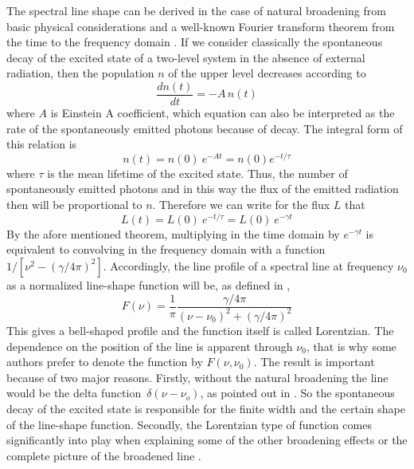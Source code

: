 The spectral line shape can be derived in the case of natural
broadening from basic physical considerations and a well-known Fourier
transform theorem from the time to the frequency domain \citep{thorne:99}. If we
consider classically the spontaneous decay of the excited state of a
two-level system in the absence of external radiation, then the population
$n$ of the upper level decreases according to
\begin{equation}\label{spon_decay_diff}
  \frac{dn(t)}{dt} = -A\,n(t)
\end{equation}
where $A$ is Einstein A coefficient, which equation can also be
interpreted as the rate of the spontaneously emitted photons because
of decay. The integral form of this relation is 
\begin{equation}\label{spon_decay_exp}
  n(t)=n(0)~e^{-At}=n(0)e^{-t/\tau}
\end{equation}
where $ \tau$ is the mean lifetime of the excited state. Thus, the
number of spontaneously emitted photons and in this way the flux of
the emitted radiation then will be proportional to $n$. Therefore we
can write for the flux $L$ that
\begin{equation}\label{flux}
  L(t)=L(0)~e^{-t/ \tau}=L(0)~e^{-\gamma t}
\end{equation}
By the afore mentioned theorem, multiplying in the time domain by
$e^{-\gamma t}$ is equivalent to convolving in the frequency domain
with a function $1/[\nu^2 - (\gamma/4\pi)^2]$. Accordingly, the line
profile of a spectral line at frequency $ \nu_0$ as a normalized
line-shape function will be, as defined in \citet{thorne:99},
\begin{equation}\label{natural_lorentz}
  F(\nu)=\frac{1}{\pi}\frac{\gamma/4\pi}{(\nu - \nu_0)^2 + (\gamma/4\pi)^2}
\end{equation}
This gives a bell-shaped profile and the function itself is called
Lorentzian. The dependence on the position of the line is apparent
through $\nu_0$, that is why some authors prefer to denote the
function by $F(\nu,\nu_0)$.  The result is important because of two
major reasons.  Firstly, without the natural broadening the line would
be the delta function~$\delta (\nu - \nu_o)$, as pointed out in
\citet{bernath:95}. So the spontaneous decay of the excited state is
responsible for the finite width and the certain shape of the
line-shape function. Secondly, the Lorentzian type of function comes
significantly into play when explaining some of the other broadening
effects or the complete picture of the broadened line \citep{thorne:99}.

